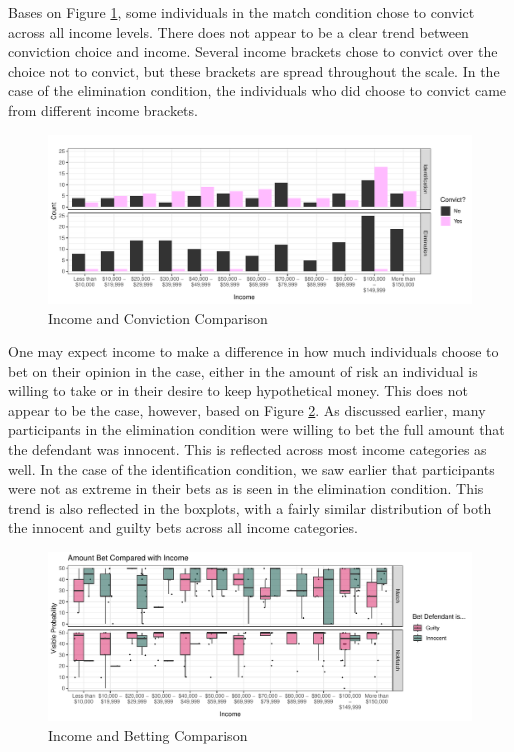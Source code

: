 \documentclass[print]{nuthesis}
\begin{document}
Bases on Figure \ref{fig:convictsincome}, some individuals in the match condition chose to convict across all income levels.
There does not appear to be a clear trend between conviction choice and income.
Several income brackets chose to convict over the choice not to convict, but these brackets are spread throughout the scale.
In the case of the elimination condition, the individuals who did choose to convict came from different income brackets.

\begin{figure}

{\centering \includegraphics[width=\linewidth]{thesis_files/figure-latex/convictsincome-1} 

}

\caption{Income and Conviction Comparison}\label{fig:convictsincome}
\end{figure}

One may expect income to make a difference in how much individuals choose to bet on their opinion in the case, either in the amount of risk an individual is willing to take or in their desire to keep hypothetical money.
This does not appear to be the case, however, based on Figure \ref{fig:incomebet}.
As discussed earlier, many participants in the elimination condition were willing to bet the full amount that the defendant was innocent.
This is reflected across most income categories as well.
In the case of the identification condition, we saw earlier that participants were not as extreme in their bets as is seen in the elimination condition.
This trend is also reflected in the boxplots, with a fairly similar distribution of both the innocent and guilty bets across all income categories.

\begin{figure}

{\centering \includegraphics[width=\linewidth]{thesis_files/figure-latex/incomebet-1} 

}

\caption{Income and Betting Comparison}\label{fig:incomebet}
\end{figure}
\end{document}
